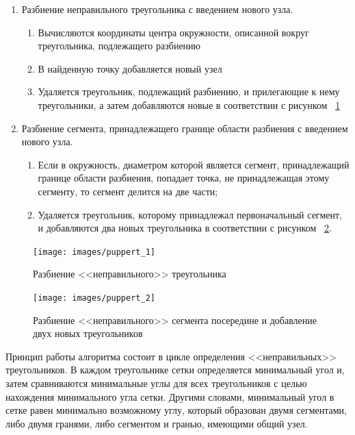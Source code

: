 \documentclass[14pt]{extreport}
\begin{document}
\begin{enumerate}

\item Разбиение неправильного треугольника с введением нового узла.

\begin{enumerate}

\item Вычисляются координаты центра окружности, описанной вокруг треугольника, подлежащего разбиению

\item В найденную точку добавляется новый узел

\item Удаляется треугольник, подлежащий разбиению, и прилегающие к нему треугольники, а затем добавляются новые в соответствии с рисунком ~\ref{img:triangle:1}

\end{enumerate}

\item Разбиение сегмента, принадлежащего границе области разбиения с введением нового узла. 

\begin{enumerate}

\item Если в окружность, диаметром которой является сегмент, принадлежащий границе области разбиения, попадает точка, не принадлежащая этому сегменту, то сегмент делится на две части;

\item Удаляется треугольник, которому принадлежал первоначальный сегмент, и добавляются два новых треугольника в соответствии с рисунком ~\ref{img:triangle:2}.

\end{enumerate}
\end{enumerate}

\begin{figure}[H]
\centerline{\texttt{[image: images/puppert\_1]}}
\caption{Разбиение <<неправильного>> треугольника}
\label{img:triangle:1}
\end{figure}


\begin{figure}[H]
\centerline{\texttt{[image: images/puppert\_2]}}
\caption{Разбиение <<неправильного>> сегмента посередине и добавление двух новых треугольников}
\label{img:triangle:2}
\end{figure}


Принцип работы алгоритма состоит в цикле определения <<неправильных>> треугольников. В каждом треугольнике сетки определяется минимальный угол и, затем сравниваются минимальные углы для всех треугольников с целью нахождения минимального угла сетки. Другими словами, минимальный угол в сетке равен минимально возможному углу, который образован двумя сегментами, либо двумя гранями, либо сегментом и гранью, имеющими общий узел.
\end{document}
